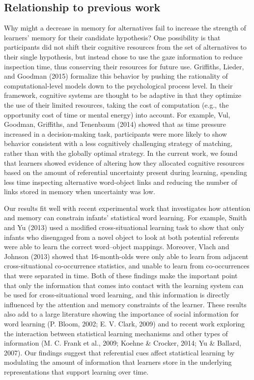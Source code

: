 \documentclass[oneside]{report}
\begin{document}
\subsection{Relationship to previous
work}\label{relationship-to-previous-work}

Why might a decrease in memory for alternatives fail to increase the
strength of learners' memory for their candidate hypothesis? One
possibility is that participants did not shift their cognitive resources
from the set of alternatives to their single hypothesis, but instead
chose to use the gaze information to reduce inspection time, thus
conserving their resources for future use. Griffiths, Lieder, and
Goodman (2015) formalize this behavior by pushing the rationality of
computational-level models down to the psychological process level. In
their framework, cognitive systems are thought to be adaptive in that
they optimize the use of their limited resources, taking the cost of
computation (e.g., the opportunity cost of time or mental energy) into
account. For example, Vul, Goodman, Griffiths, and Tenenbaum (2014)
showed that as time pressure increased in a decision-making task,
participants were more likely to show behavior consistent with a less
cognitively challenging strategy of matching, rather than with the
globally optimal strategy. In the current work, we found that learners
showed evidence of altering how they allocated cognitive resources based
on the amount of referential uncertainty present during learning,
spending less time inspecting alternative word-object links and reducing
the number of links stored in memory when uncertainty was low.

Our results fit well with recent experimental work that investigates how
attention and memory can constrain infants' statistical word learning.
For example, Smith and Yu (2013) used a modified cross-situational
learning task to show that only infants who disengaged from a novel
object to look at both potential referents were able to learn the
correct word--object mappings. Moreover, Vlach and Johnson (2013) showed
that 16-month-olds were only able to learn from adjacent
cross-situational co-occurrence statistics, and unable to learn from
co-occurrences that were separated in time. Both of these findings make
the important point that only the information that comes into contact
with the learning system can be used for cross-situational word
learning, and this information is directly influenced by the attention
and memory constraints of the learner. These results also add to a large
literature showing the importance of social information for word
learning (P. Bloom, 2002; E. V. Clark, 2009) and to recent work
exploring the interaction between statistical learning mechanisms and
other types of information (M. C. Frank et al., 2009; Koehne \& Crocker,
2014; Yu \& Ballard, 2007). Our findings suggest that referential cues
affect statistical learning by modulating the amount of information that
learners store in the underlying representations that support learning
over time.
\end{document}
